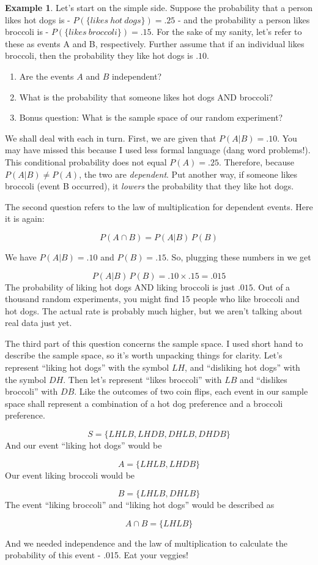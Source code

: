 \documentclass[
]{book}
\providecommand{\tightlist}{%
  \setlength{\itemsep}{0pt}\setlength{\parskip}{0pt}}
\theoremstyle{definition}
\theoremstyle{definition}
\newtheorem{example}{Example}[chapter]
\theoremstyle{definition}
\theoremstyle{definition}
\theoremstyle{remark}
\begin{document}
\begin{example}
Let's start on the simple side. Suppose the probability that a person likes hot dogs is - \(P(\{likes\:hot\:dogs\}) = .25\) - and the probability a person likes broccoli is - \(P(\{likes\:broccoli\}) = .15\). For the sake of my sanity, let's refer to these as events A and B, respectively. Further assume that if an individual likes broccoli, then the probability they like hot dogs is \(.10\).

\begin{enumerate}
\def\labelenumi{\arabic{enumi}.}
\tightlist
\item
  Are the events \(A\) and \(B\) independent?
\item
  What is the probability that someone likes hot dogs AND broccoli?
\item
  Bonus question: What is the sample space of our random experiment?
\end{enumerate}

We shall deal with each in turn. First, we are given that \(P(A|B) = .10\). You may have missed this because I used less formal language (dang word problems!). This conditional probability does not equal \(P(A) = .25\). Therefore, because \(P(A|B)\neq P(A)\), the two are \emph{dependent}. Put another way, if someone likes broccoli (event B occurred), it \emph{lowers} the probability that they like hot dogs.

The second question refers to the law of multiplication for dependent events. Here it is again:

\[P(A \cap B) = P(A|B)\,P(B)\]

We have \(P(A|B) = .10\) and \(P(B) = .15\). So, plugging these numbers in we get

\[P(A|B)\,P(B) = .10 \times .15 = .015\]
The probability of liking hot dogs AND liking broccoli is just \(.015\). Out of a thousand random experiments, you might find 15 people who like broccoli and hot dogs. The actual rate is probably much higher, but we aren't talking about real data just yet.

The third part of this question concerns the sample space. I used short hand to describe the sample space, so it's worth unpacking things for clarity. Let's represent ``liking hot dogs'' with the symbol \(LH\), and ``disliking hot dogs'' with the symbol \(DH\). Then let's represent ``likes broccoli'' with \(LB\) and ``dislikes broccoli'' with \(DB\). Like the outcomes of two coin flips, each event in our sample space shall represent a combination of a hot dog preference and a broccoli preference.

\[S = \{LHLB, LHDB, DHLB, DHDB\}\]
And our event ``liking hot dogs'' would be

\[ A = \{LHLB, LHDB\} \]
Our event liking broccoli would be

\[ B = \{LHLB, DHLB\} \]
The event ``liking broccoli'' and ``liking hot dogs'' would be described as

\[ A \cap B = \{LHLB\} \]

And we needed independence and the law of multiplication to calculate the probability of this event - .015. Eat your veggies!
\end{example}
\end{document}
